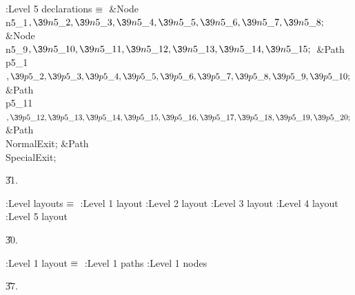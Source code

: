 \B{}:Level 5 declarations\X${}\equiv{}$\6
\&{Node} \\{n5\_1}${},\39\\{n5\_2},\39\\{n5\_3},\39\\{n5\_4},\39\\{n5\_5},\39%
\\{n5\_6},\39\\{n5\_7},\39\\{n5\_8};{}$\6
\&{Node} \\{n5\_9}${},\39\\{n5\_10},\39\\{n5\_11},\39\\{n5\_12},\39\\{n5\_13},%
\39\\{n5\_14},\39\\{n5\_15};{}$\6
\&{Path} \\{p5\_1}${},\39\\{p5\_2},\39\\{p5\_3},\39\\{p5\_4},\39\\{p5\_5},\39%
\\{p5\_6},\39\\{p5\_7},\39\\{p5\_8},\39\\{p5\_9},\39\\{p5\_10};{}$\6
\&{Path} \\{p5\_11}${},\39\\{p5\_12},\39\\{p5\_13},\39\\{p5\_14},\39\\{p5\_15},%
\39\\{p5\_16},\39\\{p5\_17},\39\\{p5\_18},\39\\{p5\_19},\39\\{p5\_20};{}$\6
\&{Path} \\{NormalExit};\6
\&{Path} \\{SpecialExit};\par
\U31.\fi

\B{}:Level layouts\X${}\equiv{}$\6
:Level 1 layout\X\6
:Level 2 layout\X\6
:Level 3 layout\X\6
:Level 4 layout\X\6
:Level 5 layout\X\par
\U30.\fi

\B{}:Level 1 layout\X${}\equiv{}$\6
:Level 1 paths\X\6
:Level 1 nodes\X\par
\U37.\fi

